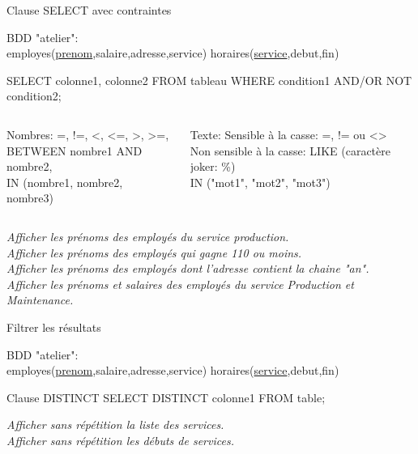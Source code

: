 \documentclass[xetex,dvipsnames]{beamer}
\begin{document}
\begin{frame}[t]{Clause SELECT avec contraintes}
\begin{small}
		BDD "atelier": \\employes(\underline{prenom},salaire,adresse,service) horaires(\underline{service},debut,fin)
\end{small}	\begin{alertblock}{}
		SELECT colonne1, colonne2 FROM tableau WHERE condition1 AND/OR NOT condition2;
	\end{alertblock}
	
\begin{footnotesize}
 \begin{columns}
    \begin{column}{0.5\textwidth}
	\begin{block}{Nombres:}
		=, !=, <, <=, >, >=,
		\\BETWEEN nombre1 AND nombre2,
		\\IN (nombre1, nombre2, nombre3)
	\end{block}
	    \end{column}
	    \begin{column}{0.5\textwidth}
		\begin{block}{Texte:}
Sensible à la casse: =, != ou <> 
\\Non sensible à la casse: LIKE (caractère joker: \%)
\\IN ("mot1", "mot2", "mot3")
	\end{block}
		    \end{column}
	    \end{columns}

\end{footnotesize}
		\textit{Afficher les prénoms des employés du service production.}\\
		\textit{Afficher les prénoms des employés qui gagne 110 ou moins.}\\
		\textit{Afficher les prénoms des employés dont l'adresse contient la chaine "an".}\\
		\textit{Afficher les prénoms et salaires des employés du service Production et Maintenance.}\\
\end{frame}


\begin{frame}[t]{Filtrer les résultats}
\begin{small}
		BDD "atelier": \\employes(\underline{prenom},salaire,adresse,service) horaires(\underline{service},debut,fin)
\end{small}	
	\begin{alertblock}{Clause DISTINCT}
		SELECT DISTINCT colonne1 FROM table;
	\end{alertblock}
	
		\textit{Afficher sans répétition la liste des services.}\\
		\textit{Afficher sans répétition les débuts de services.}\\
\end{frame}
\end{document}
